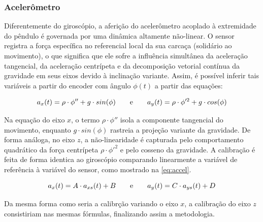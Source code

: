 \documentclass[a4paper, 12pt]{article}
\begin{document}
        \subsubsection{Acelerômetro}
            Diferentemente do giroscópio, a aferição do acelerômetro acoplado à extremidade do pêndulo é governada por uma dinâmica altamente não-linear. O sensor registra a força específica no referencial local da sua carcaça (solidário ao movimento), o que significa que ele sofre a influência simultânea da aceleração tangencial, da aceleração centrípeta e da decomposição vetorial contínua da gravidade em seus eixos devido à inclinação variante. Assim, é possível inferir tais variáveis a partir do encoder com ângulo $\phi(t)$ a partir das equações:

            \begin{equation}
                a_x(t) = \rho\cdot\phi''+g\cdot sin(\phi)
                \text{\hspace{.7cm}e\hspace{.7cm}} 
                a_y(t) = \rho\cdot\phi'^2+g\cdot cos(\phi)
            \end{equation}

            Na equação do eixo $x$, o termo $\rho\cdot\phi''$ isola a componente tangencial do movimento, enquanto $g\cdot sin(\phi)$ rastreia a projeção variante da gravidade. De forma análoga, no eixo $z$, a não-linearidade é capturada pelo comportamento quadrático da força centrípeta $\rho\cdot\phi'^2$ e pelo cosseno da gravidade. A calibração é feita de forma identica ao giroscópio comparando linearmente a variável de referência à variável do sensor, como mostrado na \autoref{eq:accel}.

            \begin{equation}
                \label{eq:accel}
                a_x(t) = A\cdot a_{xs}(t) + B  
                \text{\hspace{.7cm}e\hspace{.7cm}} 
                a_y(t) = C\cdot a_{ys}(t) + D
            \end{equation}

            Da mesma forma como seria a calibrção variando o eixo $x$, a calibração do eixo $z$ consistiriam nas mesmas fórmulas, finalizando assim a metodologia.
        
        
\newpage
\end{document}
